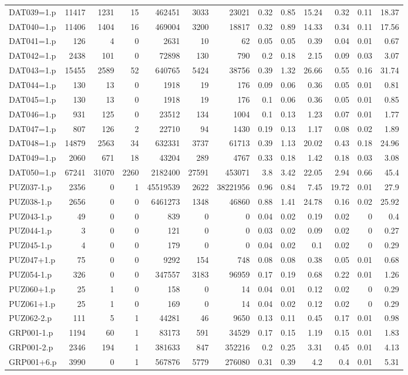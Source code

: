 \begin{table}[H]
\begin{adjustwidth}{-0.4in}{-0.5in}
\begin{tabular}{| l || r | r | r || r | r | r || r | r | r | r | r | r |}
DAT039=1.p&11417&1231&15&462451&3033&23021&0.32&0.85&15.24&0.32&0.11&18.37\\
DAT040=1.p&11406&1404&16&469004&3200&18817&0.32&0.89&14.33&0.34&0.11&17.56\\
DAT041=1.p&126&4&0&2631&10&62&0.05&0.05&0.39&0.04&0.01&0.67\\
DAT042=1.p&2438&101&0&72898&130&790&0.2&0.18&2.15&0.09&0.03&3.07\\
DAT043=1.p&15455&2589&52&640765&5424&38756&0.39&1.32&26.66&0.55&0.16&31.74\\
DAT044=1.p&130&13&0&1918&19&176&0.09&0.06&0.36&0.05&0.01&0.81\\
DAT045=1.p&130&13&0&1918&19&176&0.1&0.06&0.36&0.05&0.01&0.85\\
DAT046=1.p&931&125&0&23512&134&1004&0.1&0.13&1.23&0.07&0.01&1.77\\
DAT047=1.p&807&126&2&22710&94&1430&0.19&0.13&1.17&0.08&0.02&1.89\\
DAT048=1.p&14879&2563&34&632331&3737&61713&0.39&1.13&20.02&0.43&0.18&24.96\\
DAT049=1.p&2060&671&18&43204&289&4767&0.33&0.18&1.42&0.18&0.03&3.08\\
DAT050=1.p&67241&31070&2260&2182400&27591&453071&3.8&3.42&22.05&2.94&0.66&45.4\\
PUZ037-1.p&2356&0&1&45519539&2622&38221956&0.96&0.84&7.45&19.72&0.01&27.9\\
PUZ038-1.p&2656&0&0&6461273&1348&46860&0.88&1.41&24.78&0.16&0.02&25.92\\
PUZ043-1.p&49&0&0&839&0&0&0.04&0.02&0.19&0.02&0&0.4\\
PUZ044-1.p&3&0&0&121&0&0&0.03&0.02&0.09&0.02&0&0.27\\
PUZ045-1.p&4&0&0&179&0&0&0.04&0.02&0.1&0.02&0&0.29\\
PUZ047+1.p&75&0&0&9292&154&748&0.08&0.08&0.38&0.05&0.01&0.68\\
PUZ054-1.p&326&0&0&347557&3183&96959&0.17&0.19&0.68&0.22&0.01&1.26\\
PUZ060+1.p&25&1&0&158&0&14&0.04&0.01&0.12&0.02&0&0.29\\
PUZ061+1.p&25&1&0&169&0&14&0.04&0.02&0.12&0.02&0&0.29\\
PUZ062-2.p&111&5&1&44281&46&9650&0.13&0.11&0.45&0.17&0.01&0.98\\
GRP001-1.p&1194&60&1&83173&591&34529&0.17&0.15&1.19&0.15&0.01&1.83\\
GRP001-2.p&2346&194&1&381633&847&352216&0.2&0.25&3.31&0.45&0.01&4.13\\
GRP001+6.p&3990&0&1&567876&5779&276080&0.31&0.39&4.2&0.4&0.01&5.31\\

\end{tabular}
\end{adjustwidth}
\end{table}

